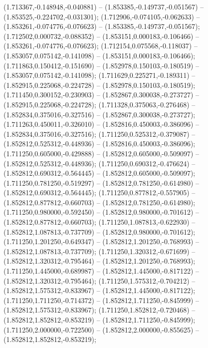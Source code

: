  (1.713367,-0.148948,-0.040881) -- (1.853385,-0.149737,-0.051567) -- (1.853525,-0.224702,-0.031301);
 (1.712906,-0.074105,-0.062633) -- (1.853261,-0.074776,-0.076623) -- (1.853385,-0.149737,-0.051567);
 (1.712502,0.000732,-0.088352) -- (1.853151,0.000183,-0.106466) -- (1.853261,-0.074776,-0.076623);
 (1.712154,0.075568,-0.118037) -- (1.853057,0.075142,-0.141098) -- (1.853151,0.000183,-0.106466);
 (1.711863,0.150412,-0.151690) -- (1.852978,0.150103,-0.180519) -- (1.853057,0.075142,-0.141098);
 (1.711629,0.225271,-0.189311) -- (1.852915,0.225068,-0.224728) -- (1.852978,0.150103,-0.180519);
 (1.711450,0.300152,-0.230903) -- (1.852867,0.300038,-0.273727) -- (1.852915,0.225068,-0.224728);
 (1.711328,0.375063,-0.276468) -- (1.852834,0.375016,-0.327516) -- (1.852867,0.300038,-0.273727);
 (1.711263,0.450011,-0.326010) -- (1.852816,0.450003,-0.386096) -- (1.852834,0.375016,-0.327516);
 (1.711250,0.525312,-0.379087) -- (1.852812,0.525312,-0.448936) -- (1.852816,0.450003,-0.386096);
 (1.711250,0.605000,-0.429888) -- (1.852812,0.605000,-0.509097) -- (1.852812,0.525312,-0.448936);
 (1.711250,0.690312,-0.476624) -- (1.852812,0.690312,-0.564445) -- (1.852812,0.605000,-0.509097);
 (1.711250,0.781250,-0.519297) -- (1.852812,0.781250,-0.614980) -- (1.852812,0.690312,-0.564445);
 (1.711250,0.877812,-0.557905) -- (1.852812,0.877812,-0.660703) -- (1.852812,0.781250,-0.614980);
 (1.711250,0.980000,-0.592450) -- (1.852812,0.980000,-0.701612) -- (1.852812,0.877812,-0.660703);
 (1.711250,1.087813,-0.622930) -- (1.852812,1.087813,-0.737709) -- (1.852812,0.980000,-0.701612);
 (1.711250,1.201250,-0.649347) -- (1.852812,1.201250,-0.768993) -- (1.852812,1.087813,-0.737709);
 (1.711250,1.320312,-0.671699) -- (1.852812,1.320312,-0.795464) -- (1.852812,1.201250,-0.768993);
 (1.711250,1.445000,-0.689987) -- (1.852812,1.445000,-0.817122) -- (1.852812,1.320312,-0.795464);
 (1.711250,1.575312,-0.704212) -- (1.852812,1.575312,-0.833967) -- (1.852812,1.445000,-0.817122);
 (1.711250,1.711250,-0.714372) -- (1.852812,1.711250,-0.845999) -- (1.852812,1.575312,-0.833967);
 (1.711250,1.852812,-0.720468) -- (1.852812,1.852812,-0.853219) -- (1.852812,1.711250,-0.845999);
 (1.711250,2.000000,-0.722500) -- (1.852812,2.000000,-0.855625) -- (1.852812,1.852812,-0.853219);
